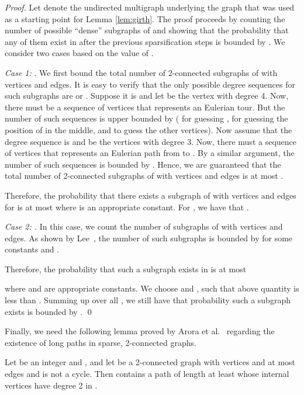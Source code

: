\documentclass[oribibl]{llncs}
\begin{document}
\begin{proof} Let  denote the undirected multigraph underlying the
	graph  that was used as a starting point for Lemma
	\ref{lem:girth}. The proof proceeds by counting the number of
	possible ``dense'' subgraphs of  and showing that the
	probability that any of them exist in  after the previous
	sparsification steps is bounded by .  We consider two
	cases based on the value of . 

\emph{Case 1: }. We first bound the
total number of 2-connected subgraphs of  with  vertices and
 edges. It is easy to verify that the only possible degree
sequences for such subgraphs are  or
. Suppose it is  and let  be the
vertex with degree 4. Now, there must be a sequence of  vertices
 that represents an Eulerian tour. But the
number of such sequences is upper bounded by  ( for guessing ,  for guessing the position of 
in the middle, and  to guess the other  vertices).
Now assume that the degree sequence is  and  be
the vertices with degree 3. Now, there must a sequence of 
vertices  that represents an
Eulerian path from  to . By a similar argument, the number of
such sequences is bounded by .  Hence, we are guaranteed
that the total number of 2-connected subgraphs of  with 
vertices and  edges is at most .

Therefore, the probability that there exists a subgraph of  with
 vertices and  edges for  is at most  	
where  is an appropriate constant. 
For , we have that
.

\emph{Case 2: .} In this case,
we count the number of subgraphs of  with  vertices and
 edges. As shown by Lee~\cite{lee2014hardness}, the number
of such subgraphs is bounded by  for some constants
 and .

Therefore, the probability that such a subgraph exists in  is at most

where  and  are appropriate constants. We choose  and , such that
above quantity is less than . Summing up over all , we still have that probability such a subgraph
exists is bounded by . \qed \end{proof}

Finally, we need the following lemma proved by Arora 
et al.~\cite{arora2002proving} regarding the existence of long paths in
sparse, 2-connected graphs.  
\begin{lemma} 
	\label{lem:arora} Let
	 be an integer and , and
	let  be a 2-connected graph with  vertices and at most
	 edges and  is not a cycle. Then  contains a
	path of length at least  whose internal vertices have
	degree 2 in .  
\end{lemma}
\end{document}
